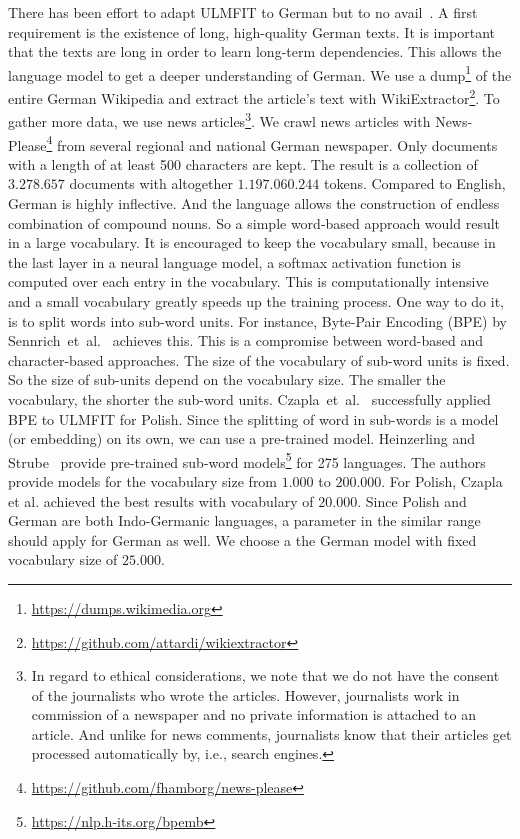 There has been effort to adapt ULMFIT to German but to no avail~\cite{ulmfit-germeval18}.
A first requirement is the existence of long, high-quality German texts.
It is important that the texts are long in order to learn long-term dependencies.
This allows the language model to get a deeper understanding of German.
We use a dump\footnote{\url{https://dumps.wikimedia.org}} of the entire German Wikipedia and extract the article's text with WikiExtractor\footnote{\url{https://github.com/attardi/wikiextractor}}.
To gather more data, we use news articles\footnote{In regard to ethical considerations, we note that we do not have the consent of the journalists who wrote the articles. However, journalists work in commission of a newspaper and no private information is attached to an article. And unlike for news comments, journalists know that their articles get processed automatically by, i.e., search engines.}.
We crawl news articles with News-Please\footnote{\url{https://github.com/fhamborg/news-please}} from several regional and national German newspaper.
Only documents with a length of at least 500 characters are kept.
The result is a collection of $3.278.657$ documents with altogether $1.197.060.244$ tokens. Compared to English, German is highly inflective.
And the language allows the construction of endless combination of compound nouns.
So a simple word-based approach would result in a large vocabulary.
It is encouraged to keep the vocabulary small, because in the last layer in a neural language model, a softmax activation function is computed over each entry in the vocabulary.
This is computationally intensive and a small vocabulary greatly speeds up the training process.
One way to do it, is to split words into sub-word units.
For instance, Byte-Pair Encoding (BPE) by Sennrich~et~al.~\cite{P16-1162} achieves this.
This is a compromise between word-based and character-based approaches.
The size of the vocabulary of sub-word units is fixed.
So the size of sub-units depend on the vocabulary size.
The smaller the vocabulary, the shorter the sub-word units.
Czapla~et~al.~\cite{czapla2018universal} successfully applied BPE to ULMFIT for Polish.
Since the splitting of word in sub-words is a model (or embedding) on its own, we can use a pre-trained model.
Heinzerling and Strube~\cite{heinzerling2018bpemb} provide pre-trained sub-word models\footnote{\url{https://nlp.h-its.org/bpemb}} for 275 languages.
The authors provide models for the vocabulary size from $1.000$ to $200.000$.
For Polish, Czapla et al. achieved the best results with vocabulary of $20.000$.
Since Polish and German are both Indo-Germanic languages, a parameter in the similar range should apply for German as well.
We choose a the German model with fixed vocabulary size of $25.000$.

